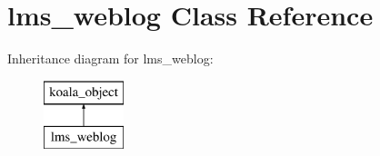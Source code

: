 \hypertarget{classlms__weblog}{
\section{lms\_\-weblog Class Reference}
\label{classlms__weblog}
}
Inheritance diagram for lms\_\-weblog:\begin{figure}[H]
\begin{center}
\leavevmode
\includegraphics[height=2.000000cm]{classlms__weblog}
\end{center}
\end{figure}
